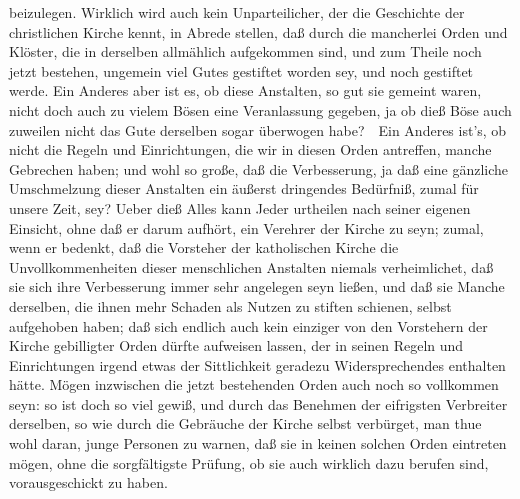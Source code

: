 \begin{RWanm}
beizulegen. Wirklich wird auch kein Unparteilicher, der die Geschichte der christlichen Kirche kennt, in Abrede stellen, daß durch die mancherlei Orden und Klöster, die in derselben allmählich aufgekommen sind, und zum Theile noch jetzt bestehen, ungemein viel Gutes gestiftet worden sey, und noch gestiftet werde. Ein Anderes aber ist es, ob diese Anstalten, so gut sie gemeint waren, nicht doch auch zu vielem Bösen eine Veranlassung gegeben, ja ob dieß Böse auch zuweilen nicht das Gute derselben sogar überwogen habe?~\ Ein Anderes ist's, ob nicht die Regeln und Einrichtungen, die wir in diesen Orden antreffen, manche Gebrechen haben; und wohl so große, daß die Verbesserung, ja daß eine gänzliche Umschmelzung dieser Anstalten ein äußerst dringendes Bedürfniß, zumal für unsere Zeit, sey? Ueber dieß Alles kann Jeder urtheilen nach seiner eigenen Einsicht, ohne daß er darum aufhört, ein Verehrer der Kirche zu seyn; zumal, wenn er bedenkt, daß die Vorsteher der katholischen Kirche die Unvollkommenheiten dieser menschlichen Anstalten niemals verheimlichet, daß sie sich ihre Verbesserung immer sehr angelegen seyn ließen, und daß sie Manche derselben, die ihnen mehr Schaden als Nutzen zu stiften schienen, selbst aufgehoben haben; daß sich endlich auch kein einziger von den Vorstehern der Kirche gebilligter Orden dürfte aufweisen lassen, der in seinen Regeln und Einrichtungen irgend etwas der Sittlichkeit geradezu Widersprechendes enthalten hätte. Mögen inzwischen die jetzt bestehenden Orden auch noch so vollkommen seyn: so ist doch so viel gewiß, und durch das Benehmen der eifrigsten Verbreiter derselben, so wie durch die Gebräuche der Kirche selbst verbürget, man thue wohl daran, junge Personen zu warnen, daß sie in keinen solchen Orden eintreten mögen, ohne die sorgfältigste Prüfung, ob sie auch wirklich dazu berufen sind, vorausgeschickt zu haben. 
\end{RWanm}

